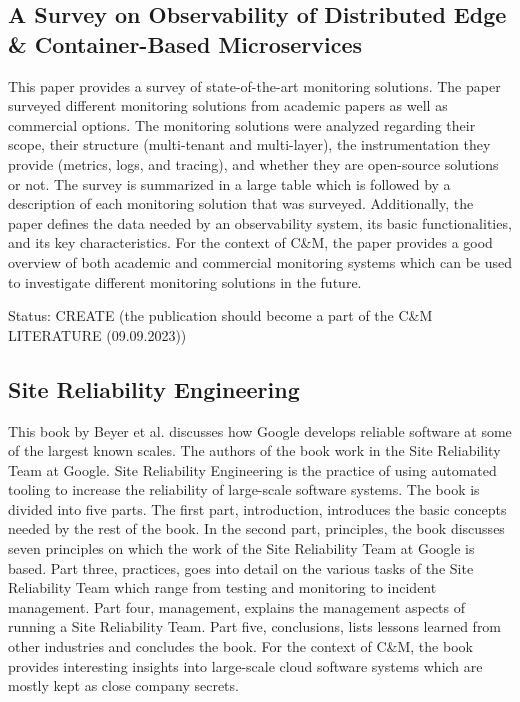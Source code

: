 \subsection*{A Survey on Observability of Distributed Edge \& Container-Based Microservices \cite{UF+22}}

This paper provides a survey of state-of-the-art monitoring solutions.
The paper surveyed different monitoring solutions from academic papers as well as
commercial options. The monitoring solutions were analyzed regarding their scope,
their structure (multi-tenant and multi-layer), the instrumentation they provide (metrics, logs, and tracing),
and whether they are open-source solutions or not. The survey is summarized in a large table
which is followed by a description of each monitoring solution that was surveyed.
Additionally, the paper defines the data needed by an observability system, its basic functionalities,
and its key characteristics. For the context of C\&M, the paper provides a good overview of
both academic and commercial monitoring systems which can be used to investigate
different monitoring solutions in the future.

Status: CREATE (the publication should become a part of the C\&M LITERATURE  (09.09.2023))

\subsection*{Site Reliability Engineering \cite{BJ+16}}

This book by Beyer et al. \cite{BJ+16} discusses how Google develops reliable software
at some of the largest known scales. The authors of the book work in the Site Reliability Team
at Google. Site Reliability Engineering is the practice of using automated tooling
to increase the reliability of large-scale software systems.
The book is divided into five parts. The first part, introduction, introduces
the basic concepts needed by the rest of the book. In the second part, principles,
the book discusses seven principles on which the work of the Site Reliability Team
at Google is based. Part three, practices, goes into detail on the various tasks
of the Site Reliability Team which range from testing and monitoring to incident management.
Part four, management, explains the management aspects of running a Site Reliability Team.
Part five, conclusions, lists lessons learned from other industries and concludes the book.
For the context of C\&M, the book provides interesting insights into large-scale cloud software
systems which are mostly kept as close company secrets. 

